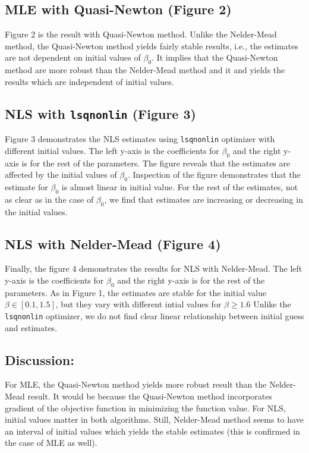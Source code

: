 \documentclass[11pt,letter]{article}
\newcommand{\code}[1]{\texttt{#1}}
\begin{document}
\subsection*{MLE with Quasi-Newton (Figure 2)}
Figure 2 is the result with Quasi-Newton method. Unlike the Nelder-Mead method, the Quasi-Newton method yields fairly stable results, i.e., the estimates are not dependent on initial values of $\beta_0$. It implies that the Quasi-Newton method are more robust than the Nelder-Mead method and it and yields the results which are independent of initial values.

\subsection*{NLS with \code{lsqnonlin} (Figure 3)}
Figure 3 demonstrates the NLS estimates using \code{lsqnonlin} optimizer with different initial values. The left y-axis is the coefficients for $\beta_0$ and the right y-axis is for the rest of the parameters. The figure reveals that the estimates are affected by the initial values of $\beta_0$. Inspection of the figure demonstrates that the estimate for $\beta_0$ is almost linear in initial value. For the rest of the estimates, not as clear as in the case of $\beta_0$, we  find that estimates are increasing or decreasing in the initial values.

\subsection*{NLS with Nelder-Mead (Figure 4)}
Finally, the figure 4 demonstrates the results for NLS with Nelder-Mead. The left y-axis is the coefficients for $\beta_0$ and the right y-axis is for the rest of the parameters. As in Figure 1, the estimates are stable for the initial value $\beta\in[0.1,1.5]$, but they vary with different intial values for $\beta\geq1.6$ Unlike the \code{lsqnonlin} optimizer, we do not find clear linear relationship between initial guess and estimates.

\subsection*{Discussion:} 
For MLE, the Quasi-Newton method yields more robust result than the Nelder-Mead result. It would be because the Quasi-Newton method incorporates gradient of the objective function in minimizing the function value. For NLS, initial values matter in both algorithms. Still, Nelder-Mead method seems to have an interval of initial values which yields the stable estimates (this is confirmed in the case of MLE as well). 
\end{document}
